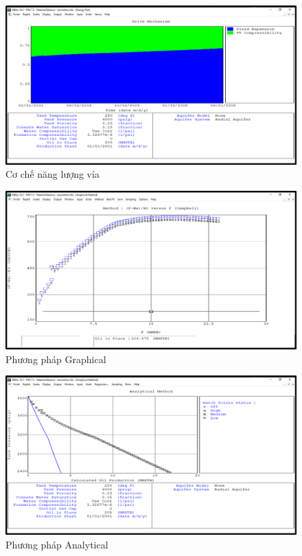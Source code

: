 \documentclass[12pt,a4paper]{report}
\begin{document}
		\begin{figure}[h]
        	\centering
            \includegraphics[scale=0.6]{Fig/drive_mechanism.png}
            \caption{Cơ chế năng lượng vỉa}
            \label{fig:drive_mech}
        \end{figure}
        \begin{figure}[h]
        	\centering
            \includegraphics[scale=0.6]{Fig/gra_method.png}
            \caption{Phương pháp Graphical}
            \label{fig:gra_method}
        \end{figure}
        \begin{figure}[h]
        	\centering
            \includegraphics[scale=0.6]{Fig/analytical_method.png}
            \caption{Phương pháp Analytical}
            \label{fig:ana_method}
        \end{figure}
\end{document}
